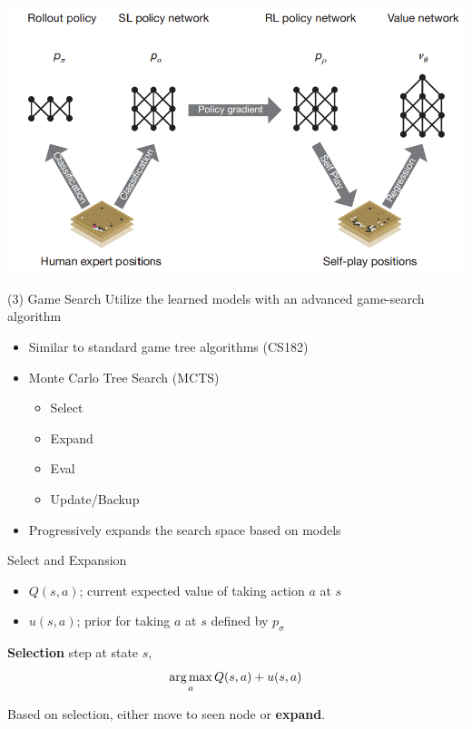 \documentclass{beamer}
\begin{document}
\begin{frame}
  \begin{center}
    \includegraphics[width=\textwidth]{alphago/full}
  \end{center}
\end{frame}



\begin{frame}{(3) Game Search}
  Utilize the learned models with an advanced game-search algorithm
  \air 

  \begin{itemize}
  \item Similar to standard game tree algorithms (CS182)
    \air 
  \item Monte Carlo Tree Search (MCTS)
    \begin{itemize}
    \item Select
    \item Expand
    \item Eval
    \item Update/Backup
    \end{itemize}
    \air
  \item Progressively expands the search space based on models
    
  \end{itemize}
\end{frame}


\begin{frame}{Select and Expansion}
  
  \begin{itemize}
  \item $Q(s,a)$; current expected value of taking action $a$ at $s$
    \air 
  \item $u(s, a)$; prior for taking $a$ at $s$ defined by $p_{\sigma}$   
  \end{itemize}

  \air 
  \textbf{Selection} step at state $s$,
  \[ \argmax_{a} Q(s,a) + u(s, a)\] 
  
  \air
  Based on selection, either move to seen node or \textbf{expand}.
\end{frame}
\end{document}
